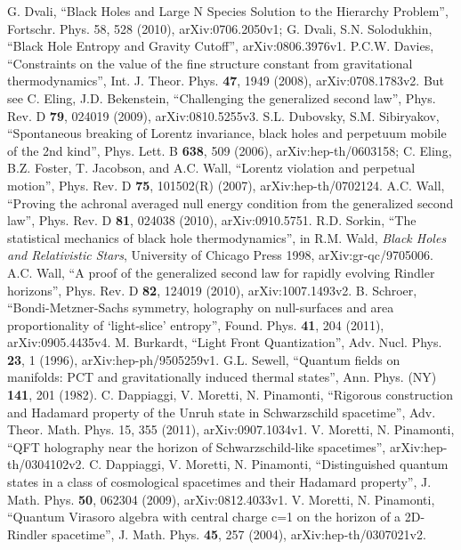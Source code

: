 \documentclass[12pt]{article}
\begin{document}
\begin{thebibliography}{299}
G. Dvali, ``Black Holes and Large N Species Solution to the Hierarchy Problem'', Fortschr. Phys. 58, 528 (2010), arXiv:0706.2050v1; G. Dvali, S.N. Solodukhin, ``Black Hole Entropy and Gravity Cutoff'', arXiv:0806.3976v1.
P.C.W. Davies, ``Constraints on the value of the fine structure constant from gravitational thermodynamics'', Int. J. Theor. Phys. \textbf{47}, 1949 (2008), arXiv:0708.1783v2.  But see C. Eling, J.D. Bekenstein, ``Challenging the generalized second law'', Phys. Rev. D \textbf{79}, 024019 (2009), arXiv:0810.5255v3.
S.L. Dubovsky, S.M. Sibiryakov, ``Spontaneous breaking of Lorentz invariance, black holes and perpetuum mobile of the 2nd kind'', Phys. Lett. B \textbf{638}, 509 (2006), arXiv:hep-th/0603158; C. Eling, B.Z. Foster, T. Jacobson, and A.C. Wall, ``Lorentz violation and perpetual motion'', Phys. Rev. D \textbf{75}, 101502(R) (2007), arXiv:hep-th/0702124.
A.C. Wall, ``Proving the achronal averaged null energy condition from the generalized second law'', Phys. Rev. D \textbf{81}, 024038 (2010), arXiv:0910.5751.
R.D. Sorkin, ``The statistical mechanics of black hole thermodynamics'', in R.M. Wald, \textit{Black Holes and Relativistic Stars}, University of Chicago Press 1998, arXiv:gr-qc/9705006.
A.C. Wall, ``A proof of the generalized second law for rapidly evolving Rindler horizons'', 	Phys. Rev. D \textbf{82}, 124019 (2010), arXiv:1007.1493v2.
B. Schroer, ``Bondi-Metzner-Sachs symmetry, holography on null-surfaces and area proportionality of `light-slice' entropy'', Found. Phys. \textbf{41}, 204 (2011), arXiv:0905.4435v4.
M. Burkardt, ``Light Front Quantization'', Adv. Nucl. Phys. \textbf{23}, 1 (1996), arXiv:hep-ph/9505259v1.
G.L. Sewell, ``Quantum fields on manifolds: PCT and gravitationally induced thermal states'',  Ann. Phys. (NY) \textbf{141}, 201 (1982).
C. Dappiaggi, V. Moretti, N. Pinamonti, ``Rigorous construction and Hadamard property of the Unruh state in Schwarzschild spacetime'', Adv. Theor. Math. Phys. 15, 355 (2011), arXiv:0907.1034v1.
V. Moretti, N. Pinamonti, ``QFT holography near the horizon of Schwarzschild-like spacetimes'', arXiv:hep-th/0304102v2.
C. Dappiaggi, V. Moretti, N. Pinamonti, ``Distinguished quantum states in a class of cosmological spacetimes and their Hadamard property'', J. Math. Phys. \textbf{50}, 062304 (2009), arXiv:0812.4033v1.
V. Moretti, N. Pinamonti, ``Quantum Virasoro algebra with central charge c=1 on the horizon of a 2D-Rindler spacetime'', J. Math. Phys. \textbf{45}, 257 (2004), arXiv:hep-th/0307021v2.

\end{thebibliography}
\end{document}
